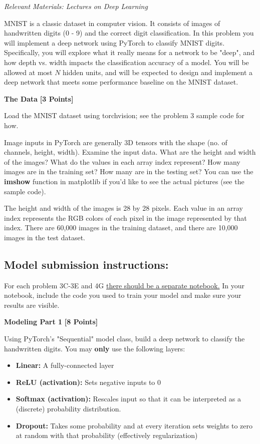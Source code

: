 \textit{Relevant Materials: Lectures on Deep Learning}

MNIST is a classic dataset in computer vision. It consists of images of handwritten digits (0 - 9) and the correct digit classification. In this problem you will implement a deep network using PyTorch to classify MNIST digits. Specifically, you will explore what it really means for a network to be "deep", and how depth vs. width impacts the classification accuracy of a model. You will be allowed at most $N$ hidden units, and will be expected to design and implement a deep network that meets some performance baseline on the MNIST dataset.

\medskip

\problem \textbf{The Data} \textbf{[3 Points]}

Load the MNIST dataset using torchvision; see the problem 3 sample code for how.

Image inputs in PyTorch are generally 3D tensors with the shape (no. of channels, height, width). Examine the input data. What are the height and width of the images? What do the values in each array index represent?  How many images are in the training set? How many are in the testing set? You can use the \textbf{imshow} function in matplotlib if you'd like to see the actual pictures (see the sample code).

\begin{subsolution}
  The height and width of the images is 28 by 28 pixels. Each value in an array index represents the RGB colors of each pixel in the image represented by that index. There are 60,000 images in the training dataset, and there are 10,000 images in the test dataset.
\end{subsolution}

\subsection{Model submission instructions: }
For each problem 3C-3E and 4G \underline{there should be a separate notebook.} In your notebook, include the code you used to train your model and make sure your results are visible.

 \problem \textbf{Modeling Part 1} \textbf{[8 Points]}

 Using PyTorch's "Sequential" model class, build a deep network to classify the handwritten digits. You may \textbf{only} use the following layers:

 \begin{itemize}
  \item \textbf{Linear:} A fully-connected layer
  \item \textbf{ReLU (activation):} Sets negative inputs to 0
  \item \textbf{Softmax (activation):} Rescales input so that it can be interpreted as a (discrete) probability distribution.
  \item \textbf{Dropout:} Takes some probability and at every iteration sets weights to zero at random with that probability (effectively regularization)
\end{itemize}

